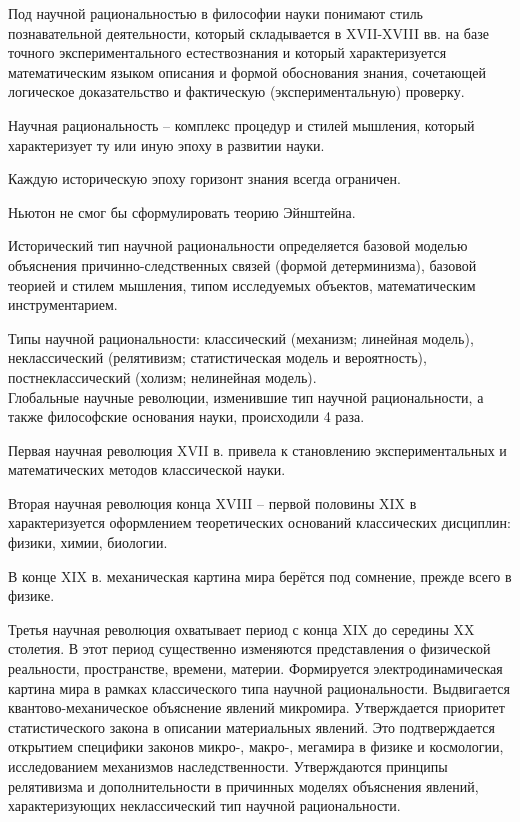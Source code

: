 \documentclass[exam_answers.tex]{subfiles}
\begin{document}
\renewcommand{\baselinestretch}{0.75}

Под научной рациональностью в философии науки понимают стиль познавательной деятельности, который складывается в XVII-XVIII вв. на базе точного экспериментального естествознания и который характеризуется математическим языком описания и формой обоснования знания, сочетающей логическое доказательство и фактическую (экспериментальную) проверку.

Научная рациональность – комплекс процедур и стилей мышления, который характеризует ту или иную эпоху в развитии науки.

Каждую историческую эпоху горизонт знания всегда ограничен.

Ньютон не смог бы сформулировать теорию Эйнштейна.

Исторический тип научной рациональности определяется базовой моделью объяснения причинно-следственных связей (формой детерминизма), базовой теорией и стилем мышления, типом исследуемых объектов, математическим инструментарием.

Типы научной рациональности: классический (механизм; линейная модель), неклассический (релятивизм; статистическая модель и вероятность), постнеклассический (холизм; нелинейная модель).
\\

Глобальные научные революции, изменившие тип научной рациональности, а также философские основания науки, происходили 4 раза.

Первая научная революция XVII в. привела к становлению экспериментальных и математических методов классической науки.

Вторая научная революция конца XVIII – первой половины XIX в характеризуется оформлением теоретических оснований классических дисциплин: физики, химии, биологии.

В конце XIX в. механическая картина мира берётся под сомнение, прежде всего в физике.

Третья научная революция охватывает период с конца XIX до середины XX столетия. В этот период существенно изменяются представления о физической реальности, пространстве, времени, материи.
Формируется электродинамическая картина мира в рамках классического типа научной рациональности.
Выдвигается квантово-механическое объяснение явлений микромира.
Утверждается приоритет статистического закона в описании материальных явлений.
Это подтверждается открытием специфики законов микро-, макро-, мегамира в физике и космологии, исследованием механизмов наследственности.
Утверждаются принципы релятивизма и дополнительности в причинных моделях объяснения явлений, характеризующих неклассический тип научной рациональности.
\end{document}
